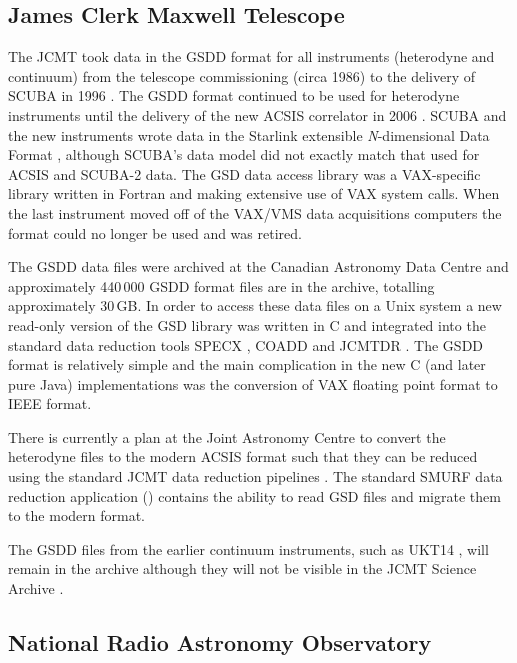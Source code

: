 \documentclass[final,authoryear,5p,times,twocolumn]{elsarticle}
\begin{document}
\subsection{James Clerk Maxwell Telescope}

The JCMT took data in the GSDD format for all instruments (heterodyne
and continuum) from the telescope commissioning (circa 1986) to the
delivery of SCUBA in 1996 \citep{1999MNRAS.303..659H}. The GSDD format
continued to be used for heterodyne instruments until the delivery of
the new ACSIS correlator in 2006 \citep{2009MNRAS.399.1026B}. SCUBA
and the new instruments wrote data in the Starlink extensible
\emph{N}-dimensional Data Format \citep[NDF;][]{2015NDF}, although
SCUBA's data model did not exactly match that used for ACSIS and
SCUBA-2 \citep{2013MNRAS.430.2513H} data. The GSD data access library
was a VAX-specific library \citep{1986QJRAS..27..675.,mtdn84} written
in Fortran and making extensive use of VAX system calls. When
the last instrument moved off of the VAX/VMS data acquisitions computers
the format could no longer be used and was retired.

The GSDD data files were archived at the Canadian Astronomy Data
Centre and approximately 440\,000 GSDD format files are in the
archive, totalling approximately 30\,GB. In order to access these data
files on a Unix system a new read-only version of the GSD library was
written in C \citep{SUN229} and integrated into the standard data
reduction tools SPECX \citep[][]{SPECX}, COADD
\citep[][]{COADD}  and JCMTDR
\citep[][]{SUN132}.  The GSDD format is relatively
simple and the main complication in the new C (and later pure Java)
implementations was the conversion of VAX floating point format to
IEEE format.

There is currently a plan at the Joint Astronomy Centre to convert the
heterodyne files to the modern ACSIS format such that they can be
reduced using the standard JCMT data reduction pipelines
\citep{2015ACSISDR}. The standard SMURF data reduction application
(\nocite{2013ascl.soft10007J}) contains the ability to
read GSD files and migrate them to the modern format.

The GSDD files from the earlier continuum instruments, such as UKT14 \citep{1990MNRAS.243..126D}, will
remain in the archive although they will not be visible in the JCMT
Science Archive \citep{2015Economou}.

\subsection{National Radio Astronomy Observatory}
\end{document}
